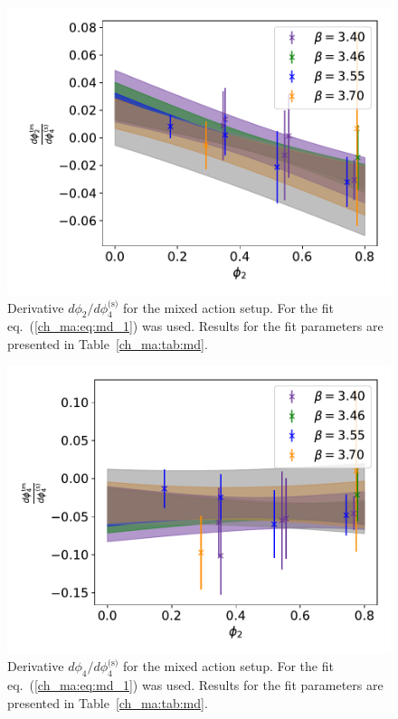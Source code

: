 \begin{figure}
    \centering
    \includegraphics[width=1.\textwidth]{./cap4/figs/der_sea_phi2.pdf}
    \caption{Derivative $d\phi_2/d\phi_4^{\textrm{(s)}}$ for the mixed action setup. For the fit eq.~(\ref{ch_ma:eq:md_1}) was used. Results for the fit parameters are presented in Table~\ref{ch_ma:tab:md}.}
    \label{ch_ma:fig:dphi2_tm}
\end{figure}

\begin{figure}
    \centering
    \includegraphics[width=1.\textwidth]{./cap4/figs/der_sea_phi4.pdf}
    \caption{Derivative $d\phi_4/d\phi_4^{\textrm{(s)}}$ for the mixed action setup. For the fit eq.~(\ref{ch_ma:eq:md_1}) was used. Results for the fit parameters are presented in Table~\ref{ch_ma:tab:md}.}
    \label{ch_ma:fig:dphi4_tm}
\end{figure}

